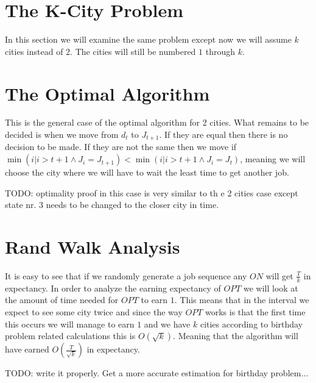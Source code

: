 \documentclass[]{article}
\begin{document}
\section{The K-City Problem}

In this section we will examine the same problem except now we will assume $ k $ cities instead of $ 2 $.
The cities will still be numbered $ 1 $ through $ k $.

\section{The Optimal Algorithm}

This is the general case of the optimal algorithm for 2 cities. What remains to be decided is when we move from $ d_t $ to $ J_{t+1} $. If they are equal then there is no decision to be made. If they are not the same then we move if $ \min({i | i > t + 1 \land J_{i} = J_{t+1}}) < \min({i | i > t + 1 \land J_{i} = J_{t}}) $, meaning we will choose the city where we will have to wait the least time to get another job.

TODO: optimality proof in this case is very similar to th e 2 cities case except state nr. 3 needs to be changed to the closer city in time.

\section{Rand Walk Analysis}

It is easy to see that if we randomly generate a job sequence any $ ON $ will get $ \frac{T}{k} $ in expectancy.
In order to analyze the earning expectancy of $ OPT $ we will look at the amount of time needed for $ OPT $ to
earn $ 1 $. This means that in the interval we expect to see some city twice and since the way $ OPT $ works is
that the first time this occurs we will manage to earn $ 1 $ and we have $ k $ cities according to birthday
problem related calculations this is $ O(\sqrt{k}) $. Meaning that the algorithm will have earned $ O(\frac{T}{\sqrt{k}}) $ in expectancy.

TODO: write it properly. Get a more accurate estimation for birthday problem...
\end{document}
